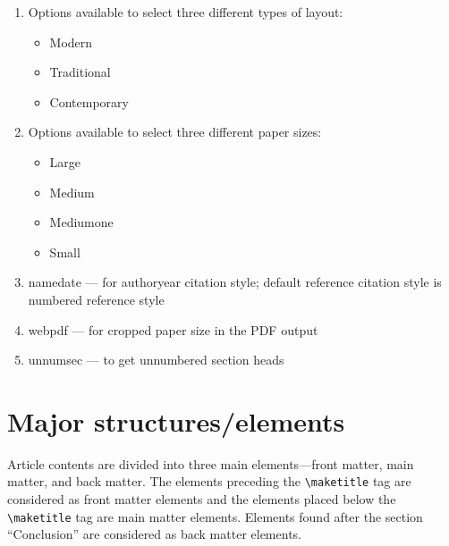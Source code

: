 \documentclass{article}
\begin{document}
\begin{enumerate}
\item[a.] Options available to select three different types of layout:
\begin{itemize}
\item Modern
\item Traditional
\item Contemporary
\end{itemize}
\item[b.] Options available to select three different paper sizes:
\begin{itemize}
\item Large
\item Medium
\item Mediumone
\item Small
\end{itemize}
\item[c.] namedate --- for authoryear citation style; default reference citation style is numbered reference style
\item[d.] webpdf --- for cropped paper size in the PDF output
\item[e.] unnumsec --- to get unnumbered section heads
\end{enumerate}

\section{Major structures/elements}

Article contents are divided into three main elements---front matter, main matter, and back matter. The elements preceding the \verb+\maketitle+ tag are considered as front matter elements and the elements placed below the \verb+\maketitle+ tag are main matter elements. Elements found after the section ``Conclusion'' are considered as back matter elements.
\end{document}
